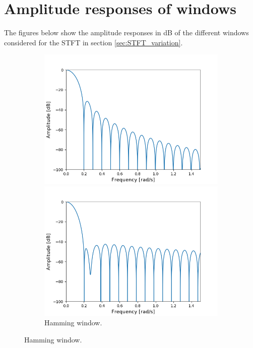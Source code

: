 \section{Amplitude responses of windows} \label{appD}
The figures below show the amplitude responses in dB of the different windows considered for the STFT in section \ref{sec:STFT_variation}.

\begin{figure}[H]
\centering
\begin{subfigure}{0.49\textwidth}
\centering
\includegraphics[width=\textwidth]{figures/dbplots/stft_bilag/64/hann.png}
\caption{Hann window.}
\includegraphics[width=\textwidth]{figures/dbplots/stft_bilag/64/hamming.png}
\caption{Hamming window.}

\end{subfigure}
\end{figure}
